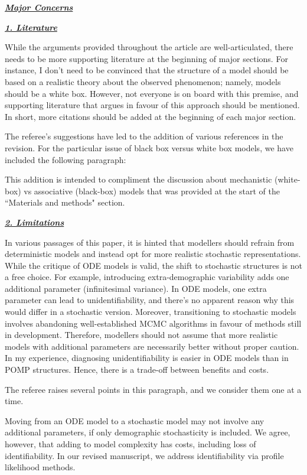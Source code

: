 \documentclass[11pt]{article}
\newcommand\report[1]{{\color{mygreen} \vspace{1mm}\hspace{0.25in}\parbox{6in}{\em #1}}}
\newcommand\article[1]{{\color{blue} \vspace{1mm}\hspace{0.25in}\parbox{6in}{\em #1}}}
\begin{document}
\report{
\textbf{\underline{Major Concerns}}
}

\report{
  \textbf{\underline{1. Literature}}

While the arguments provided throughout the article are well-articulated, there needs to be more supporting literature at the beginning of major sections. For instance, I don’t need to be convinced that the structure of a model should be based on a realistic theory about the observed phenomenon; namely, models should be a white box. However, not everyone is on board with this premise, and supporting literature that argues in favour of this approach should be mentioned. In short, more citations should be added at the beginning of each major section.
}

The referee's suggestions have led to the addition of various references in the revision.
For the particular issue of black box versus white box models, we have included the following paragraph:

\article{\editMechModels}

This addition is intended to compliment the discussion about mechanistic (white-box) vs associative (black-box) models that was provided at the start of the ``Materials and methods" section.

\report{
\textbf{\underline{2. Limitations}}

In various passages of this paper, it is hinted that modellers should refrain from deterministic models and instead opt for more realistic stochastic representations. While the critique of ODE models is valid, the shift to stochastic structures is not a free choice. For example, introducing extra-demographic variability adds one additional parameter (infinitesimal variance). In ODE models, one extra parameter can lead to unidentifiability, and there's no apparent reason why this would differ in a stochastic version. Moreover, transitioning to stochastic models involves abandoning well-established MCMC algorithms in favour of methods still in development. Therefore, modellers should not assume that more realistic models with additional parameters are necessarily better without proper caution. In my experience, diagnosing unidentifiability is easier in ODE models than in POMP structures. Hence, there is a trade-off between benefits and costs.
}

The referee raises several points in this paragraph, and we consider them one at a time.

Moving from an ODE model to a stochastic model may not involve any additional parameters, if only demographic stochasticity is included.
We agree, however, that adding to model complexity has costs, including loss of identifiability.
In our revised manuscript, we address identifiability via profile likelihood methods.
\end{document}
